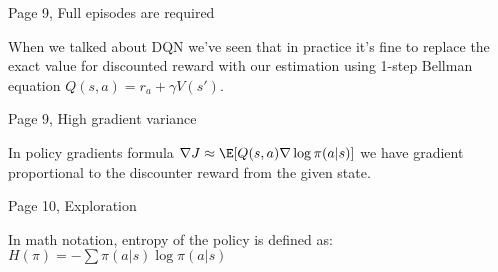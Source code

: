 Page 9, Full episodes are required

When we talked about DQN we’ve seen that in practice it’s fine to replace the
exact value for discounted reward with our estimation using 1-step Bellman
equation \begin{math}Q(s, a) = r_a + \gamma V(s')\end{math}.

Page 9, High gradient variance

In policy gradients formula \begin{math}\nabla J \approx \E[Q(s, a) \nabla\log \pi(a|s)]\end{math} we have gradient
proportional to the discounter reward from the given state.

Page 10, Exploration

In math notation, entropy of the policy is defined as: \begin{math}H(\pi) =
  -\sum \pi(a|s)\log \pi(a|s)\end{math}


